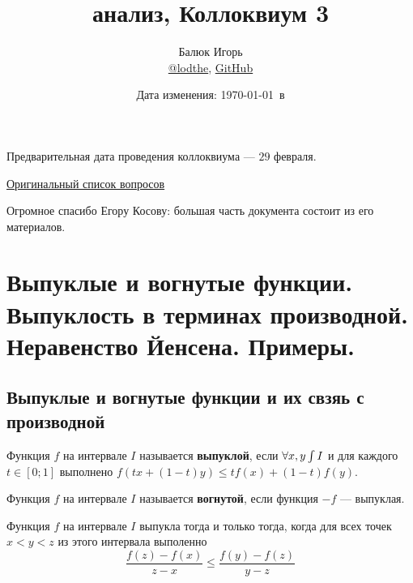 \documentclass[a4paper]{article}
\title{\HugeМатематический анализ, Коллоквиум 3}
\author{
	Балюк Игорь \\
	\href{https://teleg.run/lodthe}{@lodthe},
    \href{https://github.com/LoDThe/hse-tex}{GitHub} \\
}
\date{Дата изменения: \today \ в \currenttime}
\theoremstyle{named}
\renewcommand{\int}{\intop}
\begin{document}
    \maketitle

    \tableofcontents

    \newpage

    Предварительная дата проведения коллоквиума --- $29$ февраля.

    \href{https://www.dropbox.com/s/3sdxlo11hnmmaxw/%D0%9F%D1%80%D0%BE%D0%B3%D1%80%D0%B0%D0%BC%D0%BC%D0%B0%20%D0%BA%D0%BE%D0%BB%D0%BB%D0%BE%D0%BA%D0%B2%D0%B8%D1%83%D0%BC%D0%B0%20%D0%9C%D0%90-2-1.pdf?dl=0}{Оригинальный список вопросов}

    Огромное спасибо Егору Косову: большая часть документа состоит из его материалов.

    \section{Выпуклые и вогнутые функции. Выпуклость в терминах производной. Неравенство Йенсена. Примеры.}

        \subsection{Выпуклые и вогнутые функции и их свзяь с производной}

        \begin{definition*}
            Функция $f$ на интервале $I$ называется \textbf{выпуклой}, если $\forall x, y \int I$ и для каждого $t \in [0; 1]$ выполнено $f(tx + (1 - t)y) \leq tf(x) + (1 - t)f(y)$.

            Функция $f$ на интервале $I$ называется \textbf{вогнутой}, если функция $-f$ --- выпуклая.
        \end{definition*}

        \begin{lemma*}
            Функция $f$ на интервале $I$ выпукла тогда и только тогда, когда для всех точек $x < y < z$ из этого интервала выполенно
            \begin{equation*}
                \dfrac{f(z) - f(x)}{z - x} \leq \dfrac{f(y) - f(z)}{y - z}
            \end{equation*}
        \end{lemma*}
\end{document}
